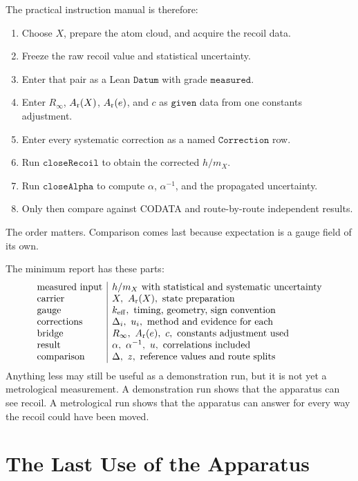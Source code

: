The practical instruction manual is therefore:
\begin{enumerate}
\item Choose \(X\), prepare the atom cloud, and acquire the recoil data.
\item Freeze the raw recoil value and statistical uncertainty.
\item Enter that pair as a Lean \(\texttt{Datum}\) with grade \(\texttt{measured}\).
\item Enter \(R_\infty\), \(A_{\rm r}(X)\), \(A_{\rm r}(e)\), and \(c\) as \(\texttt{given}\)
data from one constants adjustment.
\item Enter every systematic correction as a named \(\texttt{Correction}\) row.
\item Run \(\texttt{closeRecoil}\) to obtain the corrected \(h/m_X\).
\item Run \(\texttt{closeAlpha}\) to compute \(\alpha\), \(\alpha^{-1}\), and the propagated uncertainty.
\item Only then compare against CODATA and route-by-route independent results.
\end{enumerate}
The order matters. Comparison comes last because expectation is a gauge field of its own.

The minimum report has these parts:
\[
\begin{array}{l|l}
\hbox{measured input} & h/m_X \hbox{ with statistical and systematic uncertainty}\\
\hbox{carrier} & X,\ A_{\rm r}(X),\ \hbox{state preparation}\\
\hbox{gauge} & k_{\rm eff},\ \hbox{timing, geometry, sign convention}\\
\hbox{corrections} & \Delta_i,\ u_i,\ \hbox{method and evidence for each}\\
\hbox{bridge} & R_\infty,\ A_{\rm r}(e),\ c,\ \hbox{constants adjustment used}\\
\hbox{result} & \alpha,\ \alpha^{-1},\ u,\ \hbox{correlations included}\\
\hbox{comparison} & \Delta,\ z,\ \hbox{reference values and route splits}
\end{array}
\]
Anything less may still be useful as a demonstration run, but it is not yet a metrological measurement. A
demonstration run shows that the apparatus can see recoil. A metrological run shows that the apparatus can answer
for every way the recoil could have been moved.

\section{The Last Use of the Apparatus}

